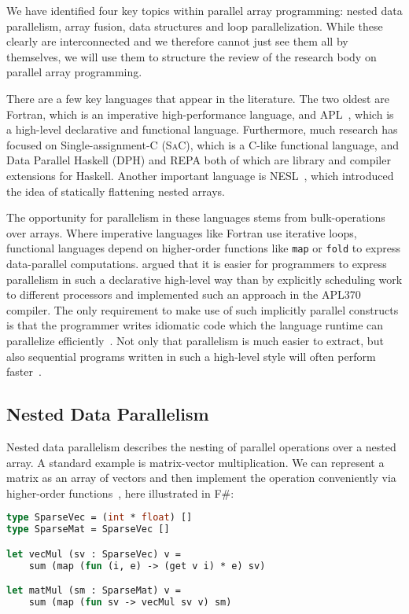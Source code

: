 \documentclass[a4paper]{article}
\newcommand{\sac}{S\textsc{a}C}
\begin{document}
We have identified four key topics within parallel array programming: nested data parallelism, array fusion, data structures and loop parallelization. While these clearly are interconnected and we therefore cannot just see them all by themselves, we will use them to structure the review of the research body on parallel array programming.

There are a few key languages that appear in the literature. The two oldest are Fortran, which is an imperative high-performance language, and APL~\cite{Iverson1962Programming}, which is a high-level declarative and functional language. Furthermore, much research has focused on Single-assignment-C (\sac{}), which is a C-like functional language, and Data Parallel Haskell (DPH) and REPA both of which are library and compiler extensions for Haskell. Another important language is NESL~\cite{Blelloch1993NESL}, which introduced the idea of statically flattening nested arrays.

The opportunity for parallelism in these languages stems from bulk-operations over arrays. Where imperative languages like Fortran use iterative loops, functional languages depend on higher-order functions like \texttt{map} or \texttt{fold} to express data-parallel computations. \citet{Ching:1990:APA:97808.97826} argued that it is easier for programmers to express parallelism in such a declarative high-level way than by explicitly scheduling work to different processors and implemented such an approach in the APL370 compiler. The only requirement to make use of such implicitly parallel constructs is that the programmer writes idiomatic code which the language runtime can parallelize efficiently~\cite{Bernecky:2015:AEP:2774959.2774962}. Not only that parallelism is much easier to extract, but also sequential programs written in such a high-level style will often perform faster~\cite{Bernecky:2015:AEP:2774959.2774962}.

\subsection{Nested Data Parallelism}
\label{sec:nest-data-parall}

Nested data parallelism describes the nesting of parallel operations over a nested array. A standard example is matrix-vector multiplication. We can represent a matrix as an array of vectors and then implement the operation conveniently via higher-order functions~\cite{Jones2008Harnessing}, here illustrated in F\#:

\begin{lstlisting}[language=ML]
type SparseVec = (int * float) []
type SparseMat = SparseVec []

let vecMul (sv : SparseVec) v =
    sum (map (fun (i, e) -> (get v i) * e) sv)

let matMul (sm : SparseMat) v =
    sum (map (fun sv -> vecMul sv v) sm)
\end{lstlisting}
\end{document}
